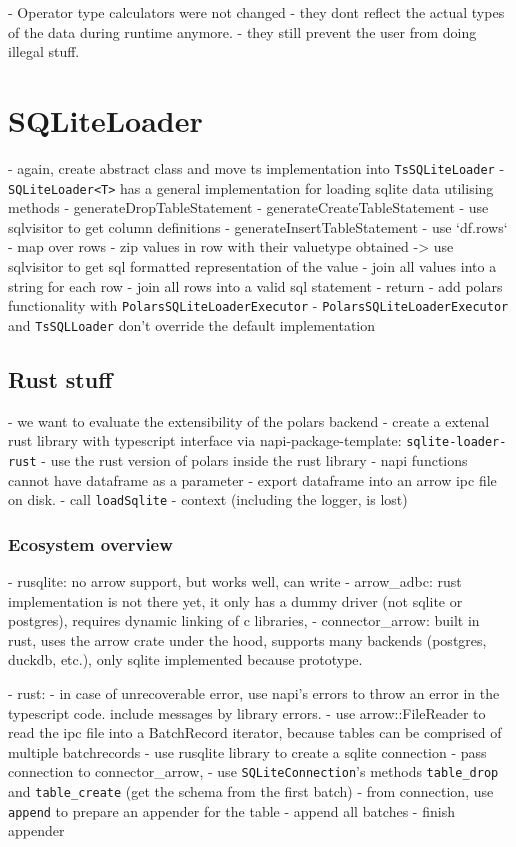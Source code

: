 - Operator type calculators were not changed
- they dont reflect the actual types of the data during runtime anymore.
- they still prevent the user from doing illegal stuff.




\section{SQLiteLoader}
- again, create abstract class and move ts implementation into \Verb|TsSQLiteLoader|
- \Verb|SQLiteLoader<T>| has a general implementation for loading sqlite data utilising methods
- generateDropTableStatement
- generateCreateTableStatement
- use sqlvisitor to get column definitions
- generateInsertTableStatement
- use `df.rows`
- map over rows
- zip values in row with their valuetype obtained -> use sqlvisitor to get sql formatted representation of the value
- join all values into a string for each row
- join all rows into a valid sql statement
- return
- add polars functionality with \Verb|PolarsSQLiteLoaderExecutor|
- \Verb|PolarsSQLiteLoaderExecutor| and \Verb|TsSQLLoader| don't override the default implementation

\subsection{Rust stuff}
- we want to evaluate the extensibility of the polars backend
- create a extenal rust library with typescript interface via napi-package-template: \Verb|sqlite-loader-rust|
- use the rust version of polars inside the rust library
- napi functions cannot have dataframe as a parameter %
- export dataframe into an arrow ipc file on disk.
- call \Verb|loadSqlite|
- context (including the logger, is lost)

\subsubsection{Ecosystem overview}
- rusqlite: no arrow support, but works well, can write
- arrow\_adbc: rust implementation is not there yet, it only has a dummy driver (not sqlite or postgres), requires dynamic linking of c libraries,
- connector\_arrow: built in rust, uses the arrow crate under the hood, supports many backends (postgres, duckdb, etc.), only sqlite implemented because prototype.

- rust:
- in case of unrecoverable error, use napi's errors to throw an error in the typescript code. include messages by library errors.
- use arrow::FileReader to read the ipc file into a BatchRecord iterator, because tables can be comprised of multiple batchrecords
- use rusqlite library to create a sqlite connection
- pass connection to connector\_arrow,
- use \Verb|SQLiteConnection|'s methods \Verb|table_drop| and \Verb|table_create| (get the schema from the first batch)
- from connection, use \Verb|append| to prepare an appender for the table
- append all batches
- finish appender





